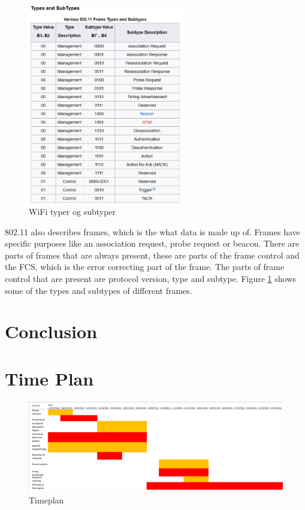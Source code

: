 \begin{figure}[!htbp]
    \centering
    \includegraphics[width=0.6\textwidth]{Latex-Files/Billeder/WIFI_Types.png}
    \caption{WiFi typer og subtyper}
    \label{Wifi Types}
\end{figure}

802.11 also describes frames, which is the what data is made up of. Frames have specific purposes like an association request, probe request or beacon. There are parts of frames that are always present, these are parts of the frame control and the FCS, which is the error correcting part of the frame. The parts of frame control that are present are protocol version, type and subtype. Figure \ref{Wifi Types} shows some of the types and subtypes of different frames. 

\section{Conclusion}

\newpage
\section{Time Plan}
\begin{figure}[!htbp]
    \centering
    \includegraphics[width=1\textwidth]{Latex-Files/Billeder/Timeplan.png}
    \caption{Timeplan}
\end{figure}
